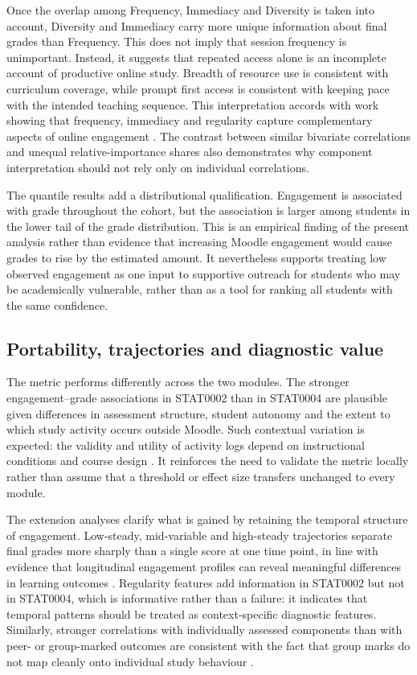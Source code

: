 \documentclass[11pt,a4paper]{article}
\begin{document}
Once the overlap among Frequency, Immediacy and Diversity is taken into account,
Diversity and Immediacy carry more unique information about final grades than
Frequency. This does not imply that session frequency is unimportant. Instead, it
suggests that repeated access alone is an incomplete account of productive online
study. Breadth of resource use is consistent with curriculum coverage, while
prompt first access is consistent with keeping pace with the intended teaching
sequence. This interpretation accords with work showing that frequency,
immediacy and regularity capture complementary aspects of online engagement
\citep{hoffman2023,you2016}. The contrast between similar bivariate correlations
and unequal relative-importance shares also demonstrates why component
interpretation should not rely only on individual correlations.

The quantile results add a distributional qualification. Engagement is associated
with grade throughout the cohort, but the association is larger among students in
the lower tail of the grade distribution. This is an empirical finding of the
present analysis rather than evidence that increasing Moodle engagement would
cause grades to rise by the estimated amount. It nevertheless supports treating
low observed engagement as one input to supportive outreach for students who may
be academically vulnerable, rather than as a tool for ranking all students with
the same confidence.

\subsection{Portability, trajectories and diagnostic value}
The metric performs differently across the two modules. The stronger
engagement--grade associations in STAT0002 than in STAT0004 are plausible given
differences in assessment structure, student autonomy and the extent to which
study activity occurs outside Moodle. Such contextual variation is expected:
the validity and utility of activity logs depend on instructional conditions and
course design \citep{gasevic2016,motz2019}. It reinforces the need to validate
the metric locally rather than assume that a threshold or effect size transfers
unchanged to every module.

The extension analyses clarify what is gained by retaining the temporal structure
of engagement. Low-steady, mid-variable and high-steady trajectories separate
final grades more sharply than a single score at one time point, in line with
evidence that longitudinal engagement profiles can reveal meaningful differences
in learning outcomes \citep{saqr2021,cerezo2016}. Regularity features add
information in STAT0002 but not in STAT0004, which is informative rather than a
failure: it indicates that temporal patterns should be treated as context-specific
diagnostic features. Similarly, stronger correlations with individually assessed
components than with peer- or group-marked outcomes are consistent with the fact
that group marks do not map cleanly onto individual study behaviour
\citep{almond2009}.
\end{document}

